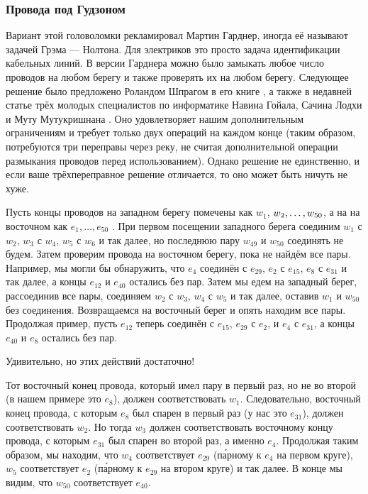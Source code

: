 \subsubsection*{Провода под Гудзоном}

Вариант этой головоломки рекламировал Мартин Гарднер,
иногда её называют задачей Грэма --- Нолтона.
Для электриков это просто задача идентификации кабельных линий.
В версии Гарднера можно было замыкать любое число проводов на любом берегу и также проверять их на любом берегу.
Следующее решение было предложено Роландом Шпрагом в его книге \cite{54}, а также в недавней статье трёх молодых специалистов по информатике Навина Гойала, Сачина Лодхи и Муту Мутукришнана \cite{33}.
Оно удовлетворяет нашим дополнительным ограничениям и требует только двух операций на каждом конце (таким образом, потребуются три переправы через реку, не считая дополнительной операции размыкания проводов перед использованием).
Однако решение не единственно, и если ваше трёхпереправное решение отличается, то оно может быть ничуть не хуже.

Пусть концы проводов на западном берегу помечены как $w_1$, $w_2, \z\dots, w_{50}$,
а на на восточном как $e_1, \dots, e_{50}$ .
При первом посещении западного берега соединим $w_1$ с $w_2$, $w_3$ с $w_4$, $w_5$ с $w_6$ и так далее, но последнюю пару $w_{49}$ и $w_{50}$ соединять не будем.
Затем проверим провода на восточном берегу, пока не найдём все пары.
Например, мы могли бы обнаружить, что $e_4$ соединён с $e_{29}$, $e_2$ с $e_{15}$, $e_8$ с $e_{31}$ и так далее, а концы $e_{12}$ и $e_{40}$ остались без пар.
Затем мы едем на западный берег, рассоединив все пары, соединяем $w_2$ с $w_3$, $w_4$ с $w_5$ и так далее, оставив $w_1$ и $w_{50}$ без соединения.
Возвращаемся на восточный берег и опять находим все пары.
Продолжая пример, пусть $e_{12}$ теперь соединён с $e_{15}$, $e_{29}$ с $e_2$, и $e_4$ с $e_{31}$, а концы $e_{40}$ и $e_8$ остались без пар.

Удивительно, но этих действий достаточно!

Тот восточный конец провода, который имел пару в первый раз, но не во второй (в нашем примере это $e_8$), должен соответствовать $w_1$.
Следовательно, восточный конец провода, с которым $e_8$ был спарен в первый раз (у нас это $e_{31}$), должен соответствовать $w_2$.
Но тогда $w_3$ должен соответствовать восточному концу провода, с которым $e_{31}$ был спарен во второй раз, а именно $e_4$.
Продолжая таким образом, мы находим, что $w_4$ соответствует $e_{29}$ (п\'{а}рному к $e_4$ на первом круге), $w_5$ соответствует $e_2$ (п\'{а}рному к $e_{29}$ на втором круге) и так далее. В конце мы видим, что $w_{50}$ соответствует $e_{40}$.

